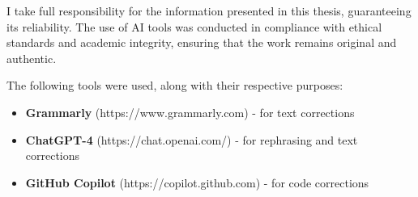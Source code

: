 I take full responsibility for the information presented in this thesis, guaranteeing its reliability. The use of AI tools was conducted in compliance with ethical standards and academic integrity, ensuring that the work remains original and authentic.

The following tools were used, along with their respective purposes:

\begin{itemize}
    \item \textbf{Grammarly} (https://www.grammarly.com) - for text corrections
    \item \textbf{ChatGPT-4} (https://chat.openai.com/) - for rephrasing and text corrections
    \item \textbf{GitHub Copilot} (https://copilot.github.com) - for code corrections
\end{itemize}


